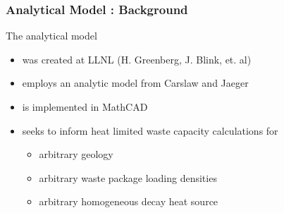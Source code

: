 
\begin{frame}[ctb!]
\frametitle{Analytical Model : Background}
The analytical  model
\begin{itemize} 
  \item was created at LLNL (H. Greenberg, J. Blink, et. al) \cite{hardin_generic_2011, sutton_investigations_2011, 
greenberg_application_2012}
  \item employs an analytic model from Carslaw and Jaeger \cite{carslaw_conduction_1959} 
  \item is implemented in MathCAD \cite{ptc_mathcad_2010}
  \item seeks to inform heat limited waste capacity calculations for 
    \begin{itemize}
      \item arbitrary geology 
      \item arbitrary waste package loading densities
      \item arbitrary homogeneous decay heat source
    \end{itemize}
\end{itemize}
\end{frame}

